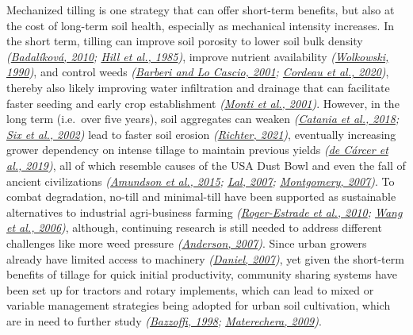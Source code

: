 \documentclass[
  12pt,
]{article}
\begin{document}
Mechanized tilling is one strategy that can offer short-term benefits, but also at the cost of long-term soil health, especially as mechanical intensity increases.
In the short term, tilling can improve soil porosity to lower soil bulk density \emph{(\protect\hyperlink{ref-badalikova10}{Badalíková, 2010}; \protect\hyperlink{ref-hill85}{Hill et al., 1985})}, improve nutrient availability \emph{(\protect\hyperlink{ref-wolkowski90}{Wolkowski, 1990})}, and control weeds \emph{(\protect\hyperlink{ref-barberi01}{Barberi and Lo Cascio, 2001}; \protect\hyperlink{ref-cordeau20}{Cordeau et al., 2020})}, thereby also likely improving water infiltration and drainage that can facilitate faster seeding and early crop establishment \emph{(\protect\hyperlink{ref-monti01}{Monti et al., 2001})}.
However, in the long term (i.e.~over five years), soil aggregates can weaken \emph{(\protect\hyperlink{ref-catania18}{Catania et al., 2018}; \protect\hyperlink{ref-six02a}{Six et al., 2002})} lead to faster soil erosion \emph{(\protect\hyperlink{ref-richter21}{Richter, 2021})}, eventually increasing grower dependency on intense tillage to maintain previous yields \emph{(\protect\hyperlink{ref-decarcer19}{de Cárcer et al., 2019})}, all of which resemble causes of the USA Dust Bowl and even the fall of ancient civilizations \emph{(\protect\hyperlink{ref-amundson15}{Amundson et al., 2015}; \protect\hyperlink{ref-lal07}{Lal, 2007}; \protect\hyperlink{ref-montgomery07}{Montgomery, 2007})}.
To combat degradation, no-till and minimal-till have been supported as sustainable alternatives to industrial agri-business farming \emph{(\protect\hyperlink{ref-roger-estrade10}{Roger-Estrade et al., 2010}; \protect\hyperlink{ref-wang06}{Wang et al., 2006})}, although, continuing research is still needed to address different challenges like more weed pressure \emph{(\protect\hyperlink{ref-anderson07}{Anderson, 2007})}.
Since urban growers already have limited access to machinery \emph{(\protect\hyperlink{ref-daniel07}{Daniel, 2007})}, yet given the short-term benefits of tillage for quick initial productivity, community sharing systems have been set up for tractors and rotary implements, which can lead to mixed or variable management strategies being adopted for urban soil cultivation, which are in need to further study \emph{(\protect\hyperlink{ref-bazzoffi98}{Bazzoffi, 1998}; \protect\hyperlink{ref-materechera09}{Materechera, 2009})}.
\end{document}
